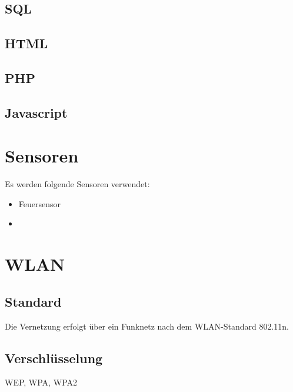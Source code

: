 \subsection{SQL}

\subsection{HTML}

\subsection{PHP}

\subsection{Javascript}

\section{Sensoren}

Es werden folgende Sensoren verwendet:

\begin{itemize}
\item Feuersensor
\item
\end{itemize}

\section{WLAN}
\subsection{Standard}

Die Vernetzung erfolgt über ein Funknetz nach dem WLAN-Standard 802.11n. 

\subsection{Verschlüsselung}
WEP, WPA, WPA2


